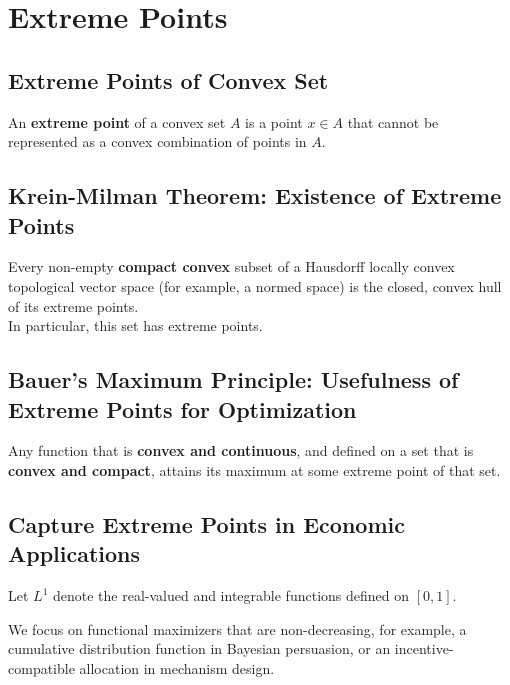 \documentclass[11pt]{elegantbook}
\begin{document}
\section{Extreme Points}
\subsection{Extreme Points of Convex Set}
\begin{definition}
    \normalfont
    An \textbf{extreme point} of a convex set $A$ is a point $x\in A$ that cannot be represented as a convex combination of points in $A$.
\end{definition}

\subsection{Krein-Milman Theorem: Existence of Extreme Points}
\begin{theorem}\label{KMT}
    Every non-empty \textbf{compact convex} subset of a Hausdorff locally convex topological vector space (for example, a normed space) is the closed, convex hull of its extreme points.\\
    In particular, this set has extreme points.
\end{theorem}


\subsection{Bauer's Maximum Principle: Usefulness of Extreme Points for Optimization}
\begin{theorem}\label{BMP}
    Any function that is \textbf{convex and continuous}, and defined on a set that is \textbf{convex and compact}, attains its maximum at some extreme point of that set.
\end{theorem}

\subsection{Capture Extreme Points in Economic Applications}
Let $L^1$ denote the real-valued and integrable functions defined on $[0,1]$.

We focus on functional maximizers that are non-decreasing, for example, a cumulative distribution function in Bayesian persuasion, or an incentive-compatible allocation in mechanism design.
\end{document}
